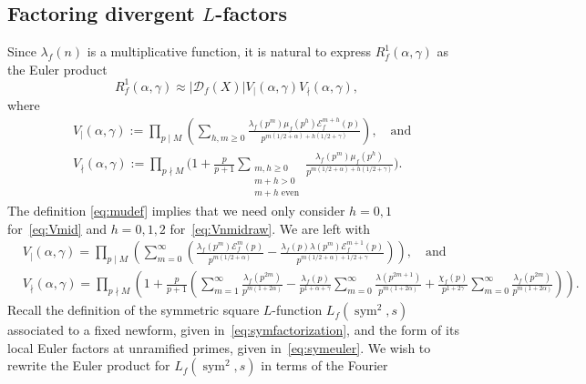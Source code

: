 \documentclass[11pt,reqno]{amsart} \usepackage{fullpage}
\renewcommand{\geq}{\geqslant}
\newcommand\be{\begin{equation}}
\newcommand\ee{\end{equation}}
\DeclareMathOperator{\sym}{sym}
\newcommand{\D}{\mathcal D_f}
\newcommand{\E}{\mathcal E_f}
\numberwithin{equation}{section}
\begin{document}
\subsection{Factoring divergent $L$-factors}
Since $\lambda_f(n)$ is a multiplicative function, it is natural to express
$R^1_f(\alpha,\gamma)$ as the Euler product
\be R^1_f(\alpha,\gamma)\approx
\left|\D(X)\right|V_\mid(\alpha,\gamma)V_\nmid(\alpha,\gamma),\ee where
\begin{align}\label{eq:Vmid}
  & V_{\mid}(\alpha,\gamma) := \prod_{p\mid M}\left(\sum_{h,m\geq 0}
    \frac{\lambda_f(p^m)\mu_f(p^h)\E^{m+h}(p)}
    {p^{m(1/2+\alpha)+h(1/2+\gamma)}}\right),\quad\text{and} \\
  & V_\nmid(\alpha,\gamma) := \prod_{p\nmid M}
  \Bigg(1 + \frac p{p+1}
    \sum_{\substack{m,h\geq 0\\m+h>0\\m+h\text{ even}}}
    \frac{\lambda_f(p^m)\mu_f(p^h)}{p^{m(1/2+\alpha)+h(1/2+\gamma)}}
  \Bigg).
  \label{eq:Vnmidraw}
\end{align}
The definition \eqref{eq:mudef} implies that we need only consider $h=0,1$
for~\eqref{eq:Vmid} and $h=0,1,2$ for~\eqref{eq:Vnmidraw}. We are left with
\begin{align}
&V_\mid(\alpha,\gamma)=\prod_{p\mid M}
\left(
  \sum_{m=0}^\infty\left(
    \frac{\lambda_f(p^{m})\E^{m}(p)}{p^{m(1/2+\alpha)}}
    -\frac{\lambda_f(p)\lambda(p^{m})\E^{m+1}(p)}
    {p^{m(1/2+\alpha)+1/2+\gamma}}
  \right)
\right),\quad\text{and} \\
&V_\nmid(\alpha,\gamma)=\prod_{p\nmid M}
\left(1+\frac p{p+1}\left(
    \sum_{m=1}^\infty
    \frac{\lambda_f(p^{2m})}{p^{m(1+2\alpha)}}
    -\frac{\lambda_f(p)}{p^{1+\alpha+\gamma}}
    \sum_{m=0}^\infty
    \frac{\lambda(p^{2m+1})}{p^{m(1+2\alpha)}}
    +\frac{\chi_f(p)}{p^{1+2\gamma}}
    \sum_{m=0}^\infty
    \frac{\lambda_f(p^{2m})}{p^{m(1+2\alpha)}}
  \right)
\right).
\label{eq:Vnmid}
\end{align}
Recall the definition of the symmetric square $L$-function $L_f(\sym^2,s)$
associated to a fixed newform, given in~\eqref{eq:symfactorization}, and the form of its
local Euler factors at unramified primes, given in~\eqref{eq:symeuler}.
We wish to rewrite the Euler product for $L_f(\sym^2,s)$ in terms of the Fourier
\end{document}
